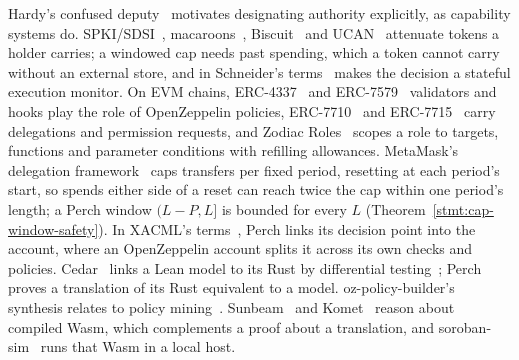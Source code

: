 Hardy's confused deputy~\cite{confused-deputy} motivates designating
authority explicitly, as capability systems do.
SPKI/SDSI~\cite{spki}, macaroons~\cite{macaroons}, Biscuit~\cite{biscuit} and
UCAN~\cite{ucan} attenuate tokens a holder carries; a windowed cap needs past
spending, which a token cannot carry without an external store, and in
Schneider's terms~\cite{schneider-enforceable} makes the decision a stateful
execution monitor. On EVM chains, ERC-4337~\cite{erc4337} and ERC-7579~\cite{erc7579} validators
and hooks play the role of OpenZeppelin policies, ERC-7710~\cite{erc7710} and
ERC-7715~\cite{erc7715} carry delegations and permission requests, and Zodiac
Roles~\cite{zodiac-roles} scopes a role to targets, functions and parameter
conditions with refilling allowances. MetaMask's delegation
framework~\cite{metamask-delegation} caps transfers per fixed period, resetting
at each period's start, so spends either side of a reset can reach twice the
cap within one period's length; a Perch window $(L-P, L]$ is bounded for every
$L$ (Theorem~\ref{stmt:cap-window-safety}). In XACML's terms~\cite{xacml3}, Perch links its decision point into the
account, where an OpenZeppelin account splits it across its own checks and
policies. Cedar~\cite{cedar} links a Lean model to its Rust by
differential testing~\cite{cedar-vgd}; Perch proves a translation of its Rust
equivalent to a model.
oz-policy-builder's synthesis relates to policy
mining~\cite{xu-stoller-mining}. Sunbeam~\cite{sunbeam} and Komet~\cite{komet}
reason about compiled Wasm, which complements a proof about a translation, and
soroban-sim~ runs that Wasm in a local host.
